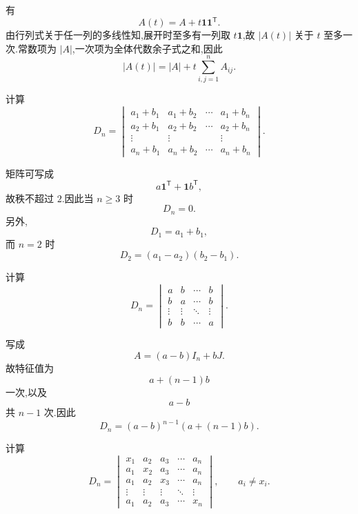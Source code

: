 \begin{solution}
有
\[
A(t)=A+t\boldsymbol{1}\boldsymbol{1}^{\mathsf T}.
\]
由行列式关于任一列的多线性知,展开时至多有一列取 $t\boldsymbol{1}$,故 $|A(t)|$ 关于 $t$ 至多一次.常数项为 $|A|$,一次项为全体代数余子式之和,因此
\[
\boxed{
|A(t)|
=
|A|
+t\sum\limits_{i,j=1}^{n}A_{ij}
}.
\]
\end{solution}


\begin{example}
计算
\[
D_n=
\begin{vmatrix}
a_1+b_1&a_1+b_2&\cdots&a_1+b_n\\
a_2+b_1&a_2+b_2&\cdots&a_2+b_n\\
\vdots&\vdots&&\vdots\\
a_n+b_1&a_n+b_2&\cdots&a_n+b_n
\end{vmatrix}.
\]
\end{example}
\exampleblank

\begin{solution}
矩阵可写成
\[
a\boldsymbol{1}^{\mathsf T}
+
\boldsymbol{1}b^{\mathsf T},
\]
故秩不超过 $2$.因此当 $n\geq3$ 时
\[
\boxed{D_n=0}.
\]
另外,
\[
D_1=a_1+b_1,
\]
而 $n=2$ 时
\[
D_2=(a_1-a_2)(b_2-b_1).
\]
\end{solution}


\begin{example}
计算
\[
D_n=
\begin{vmatrix}
a&b&\cdots&b\\
b&a&\cdots&b\\
\vdots&\vdots&\ddots&\vdots\\
b&b&\cdots&a
\end{vmatrix}.
\]
\end{example}
\exampleblank

\begin{solution}
写成
\[
A=(a-b)I_n+bJ.
\]
故特征值为
\[
a+(n-1)b
\]
一次,以及
\[
a-b
\]
共 $n-1$ 次.因此
\[
\boxed{
D_n=(a-b)^{n-1}\left(a+(n-1)b\right)
}.
\]
\end{solution}


\begin{example}
计算
\[
D_n=
\begin{vmatrix}
x_1&a_2&a_3&\cdots&a_n\\
a_1&x_2&a_3&\cdots&a_n\\
a_1&a_2&x_3&\cdots&a_n\\
\vdots&\vdots&\vdots&\ddots&\vdots\\
a_1&a_2&a_3&\cdots&x_n
\end{vmatrix},
\qquad
a_i\neq x_i.
\]
\end{example}
\exampleblank

